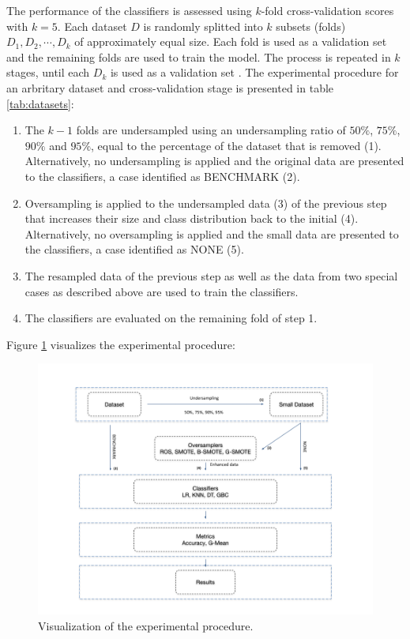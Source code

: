 \documentclass[parskip=full]{scrartcl}
\begin{document}
The performance of the classifiers is assessed using \(k \)-fold cross-validation scores with \( k = 5 \). Each dataset \( D \) is randomly splitted into \( k \) subsets (folds) \( D_1, D_2, \cdots, D_k \) of approximately equal size. Each fold is used as a validation set and the remaining folds are used to train the model. The process is repeated in \( k \) stages, until each \( D_k \) is used as a validation set \cite{Han.2012}. The experimental procedure for an arbritary dataset and cross-validation stage is presented in table \ref{tab:datasets}:

\begin{enumerate}

	\item The \( k - 1 \) folds are undersampled using an undersampling ratio
	of $50\%$, $75\%$, $90\%$ and $95\%$, equal to the percentage of the dataset that is removed (1). Alternatively, no undersampling is applied and the original data are presented to the classifiers, a case identified as BENCHMARK (2).

	\item Oversampling is applied to the undersampled data (3) of the previous
	step that increases their size and class distribution back to the initial (4). Alternatively, no oversampling is applied and the small data are presented to the classifiers, a case identified as NONE (5).

	\item The resampled data of the previous step as well as the data from two special cases as described above are used to train the classifiers.
	
	\item The classifiers are evaluated on the remaining fold of step 1.

\end{enumerate}

 Figure \ref{fig:experimentalprocedure} visualizes the experimental procedure: 

\begin{figure}[H]
	\centering
	\includegraphics[width=1.0\linewidth]{../analysis/experimental_procedure.png}
	\caption{Visualization of the experimental procedure.}
	\label{fig:experimentalprocedure}
\end{figure}
\end{document}
